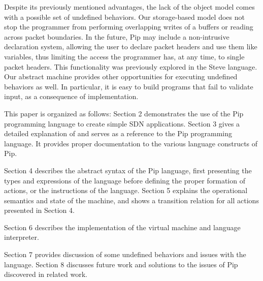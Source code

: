 Despite its previously mentioned advantages, the lack of the object model comes with a possible set of undefined behaviors. Our storage-based model does not stop the programmer from performing overlapping writes of a buffers or reading across packet boundaries. In the future, Pip may include a non-intrusive declaration system, allowing the user to declare packet headers and use them like variables, thus limiting the access the programmer has, at any time, to single packet headers. This functionality was previously explored in the Steve language. Our abstract machine provides other opportunities for executing undefined behaviors as well. In particular, it is easy to build programs that fail to validate input, as a consequence of implementation.





This paper is organized as follows: Section 2 demonstrates the use of the Pip programming language to create simple SDN applications. Section 3 gives a detailed explanation of and serves as a reference to the Pip programming language. It provides proper documentation to the various language constructs of Pip.

Section 4 describes the abstract syntax of the Pip language, first presenting the types and expressions of the language before defining the proper formation of actions, or the instructions of the language. Section 5 explains the operational semantics and state of the machine, and shows a transition relation for all actions presented in Section 4.

Section 6 describes the implementation of the virtual machine and language interpreter.

Section 7 provides discussion of some undefined behaviors and issues with the language. Section 8 discusses future work and solutions to the issues of Pip discovered in related work.
